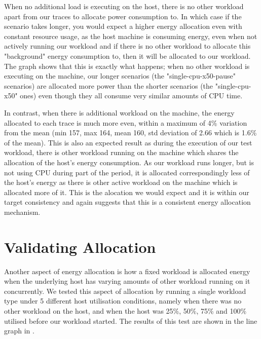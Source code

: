 When no additional load is executing on the host, there is no other workload apart from our traces to allocate power consumption to.  In which case if the scenario takes longer, you would expect a higher energy allocation even with constant resource usage, as the host machine is consuming energy, even when not actively running our workload and if there is no other workload to allocate this "background" energy consumption to, then it will be allocated to our workload.  The graph shows that this is exactly what happens; when no other workload is executing on the machine, our longer scenarios (the "single-cpu-x50-pause" scenarios) are allocated more power than the shorter scenarios (the "single-cpu-x50" ones) even though they all consume very similar amounts of CPU time.

In contrast, when there is additional workload on the machine, the energy allocated to each trace is much more even, within a maximum of 4\% variation from the mean (min 157, max 164, mean 160, std deviation of 2.66 which is 1.6\% of the mean).  This is also an expected result as during the execution of our test workload, there is other workload running on the machine which shares the allocation of the host's energy consumption.  As our workload runs longer, but is not using CPU during part of the period, it is allocated correspondingly less of the host's energy as there is other active workload on the machine which is allocated more of it.  This is the alocation we would expect and it is within our target consistency and again suggests that this is a consistent energy allocation mechanism.

\section{Validating Allocation}

Another aspect of energy allocation is how a fixed workload is allocated energy when the underlying host has varying amounts of other workload running on it concurrently.  We tested this aspect of allocation by running a single workload type under 5 different host utilisation conditions, namely when there was no other workload on the host, and when the host was 25\%, 50\%, 75\% and 100\% utilised before our workload started.  The results of this test are shown in the line graph in .

